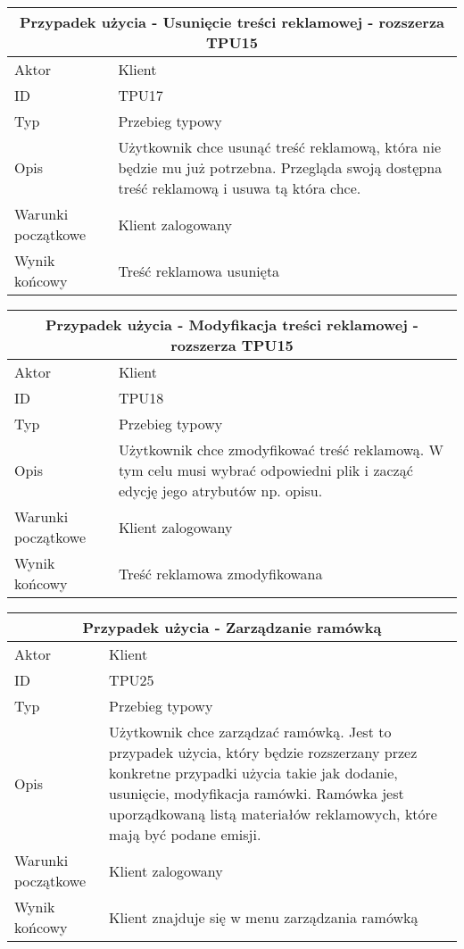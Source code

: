 \documentclass[10pt,a4paper,titlepage]{article} %
\begin{document}
		\begin {center}
		\begin{tabular}{|l|p{10cm}|}
		  \hline
		  \multicolumn{2}{|c|}{\bf Przypadek użycia - Usunięcie treści
		  reklamowej - rozszerza TPU15}\\\hline
		  \hline
		  Aktor & Klient \\ \hline
		  ID & TPU17 \\ \hline
		  Typ & Przebieg typowy \\ \hline
		  Opis & Użytkownik chce usunąć treść reklamową, która nie będzie mu już
		  potrzebna. Przegląda swoją dostępna treść reklamową i usuwa tą która chce.
		  \\
		  \hline Warunki początkowe & Klient zalogowany \\ \hline
		  Wynik końcowy & Treść reklamowa usunięta  \\
		  \hline
		\end{tabular}
		\end{center}
		
		\begin {center}
		\begin{tabular}{|l|p{10cm}|}
		  \hline
		  \multicolumn{2}{|c|}{\bf Przypadek użycia - Modyfikacja treści
		  reklamowej - rozszerza TPU15}\\\hline
		  \hline
		  Aktor & Klient \\ \hline
		  ID & TPU18 \\ \hline
		  Typ & Przebieg typowy \\ \hline
		  Opis & Użytkownik chce zmodyfikować treść reklamową. W tym celu musi wybrać
		  odpowiedni plik i zacząć edycję jego atrybutów np. opisu.
		  \\
		  \hline Warunki początkowe & Klient zalogowany \\ \hline
		  Wynik końcowy & Treść reklamowa zmodyfikowana  \\
		  \hline
		\end{tabular}
		\end{center}
		
		\begin {center}
		\begin{tabular}{|l|p{10cm}|}
		  \hline
		  \multicolumn{2}{|c|}{\bf Przypadek użycia - Zarządzanie ramówką}\\\hline
		  \hline
		  Aktor & Klient \\ \hline
		  ID & TPU25 \\ \hline
		  Typ & Przebieg typowy \\ \hline
		  Opis & Użytkownik chce zarządzać ramówką. Jest to przypadek
		  użycia, który będzie rozszerzany przez konkretne przypadki użycia takie jak
		  dodanie, usunięcie, modyfikacja ramówki. Ramówka jest uporządkowaną
		  listą materiałów reklamowych, które mają być podane emisji.
		  \\
		  \hline Warunki początkowe & Klient zalogowany \\ \hline
		  Wynik końcowy & Klient znajduje się w menu zarządzania ramówką  \\
		  \hline
		\end{tabular}
		\end{center}
		
\end{document}
